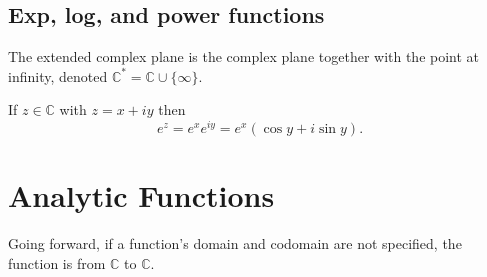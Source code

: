 \documentclass{article}
\begin{document}
\subsection{Exp, log, and power functions}
\begin{definition}
	The extended complex plane is the complex plane together with the point at infinity, denoted \(\mathbb{C}^*=\mathbb{C}\cup\{\infty\}\).
\end{definition}
\begin{proposition}
	If \(z\in\mathbb{C}\) with \(z=x+iy\) then
	\begin{equation*}
		e^z=e^xe^{iy}=e^{x}(\cos y+i\sin y).
	\end{equation*}
\end{proposition}
\section{Analytic Functions}
\begin{remark}
	Going forward, if a function's domain and codomain are not specified, the function is from \(\mathbb{C}\) to \(\mathbb{C}\).
\end{remark}
\end{document}
